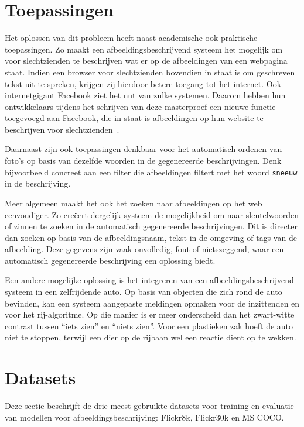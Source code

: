 \section{Toepassingen}
Het oplossen van dit probleem heeft naast academische ook praktische toepassingen. Zo maakt een afbeeldingsbeschrijvend systeem het mogelijk om voor slechtzienden te beschrijven wat er op de afbeeldingen van een webpagina staat. Indien een browser voor slechtzienden bovendien in staat is om geschreven tekst uit te spreken, krijgen zij hierdoor betere toegang tot het internet. Ook internetgigant Facebook ziet het nut van zulke systemen. Daarom hebben hun ontwikkelaars tijdens het schrijven van deze masterproef een nieuwe functie toegevoegd aan Facebook, die in staat is afbeeldingen op hun website te beschrijven voor slechtzienden~\cite{facebook}.

Daarnaast zijn ook toepassingen denkbaar voor het automatisch ordenen van foto's op basis van dezelfde woorden in de gegenereerde beschrijvingen. Denk bijvoorbeeld concreet aan een filter die afbeeldingen filtert met het woord \texttt{sneeuw} in de beschrijving. 

Meer algemeen maakt het ook het zoeken naar afbeeldingen op het web eenvoudiger. Zo cre\"eert dergelijk systeem de mogelijkheid om naar sleutelwoorden of zinnen te zoeken in de automatisch gegenereerde beschrijvingen. Dit is directer dan zoeken op basis van de afbeeldingsnaam, tekst in de omgeving of tags van de afbeelding. Deze gegevens zijn vaak onvolledig, fout of nietszeggend, waar een automatisch gegenereerde beschrijving een oplossing biedt.

Een andere mogelijke oplossing is het integreren van een afbeeldingsbeschrijvend systeem in een zelfrijdende auto. Op basis van objecten die zich rond de auto bevinden, kan een systeem aangepaste meldingen opmaken voor de inzittenden en voor het rij-algoritme. Op die manier is er meer onderscheid dan het zwart-witte contrast tussen ``iets zien'' en ``niets zien''. Voor een plastieken zak hoeft de auto niet te stoppen, terwijl een dier op de rijbaan wel een reactie dient op te wekken.

\section{Datasets}
\label{sec:Datasets}
Deze sectie beschrijft de drie meest gebruikte datasets voor training en evaluatie van modellen voor afbeeldingsbeschrijving: Flickr8k, Flickr30k en MS COCO.

